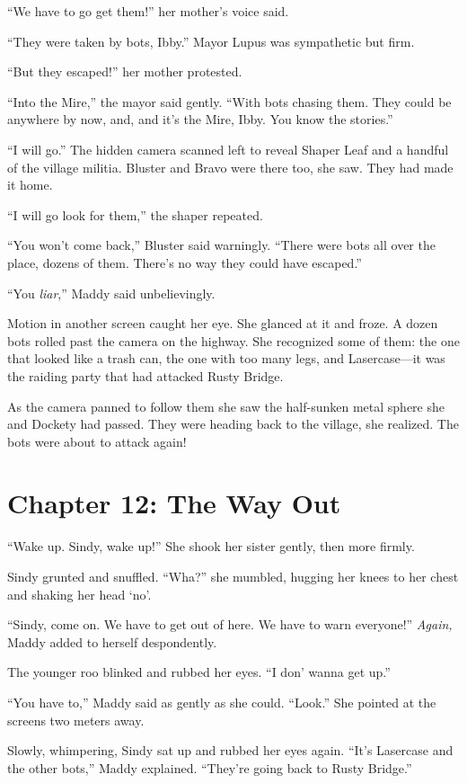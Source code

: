 \documentclass[10pt]{article}
\begin{document}
``We have to go get them!'' her mother's voice said.

``They were taken by bots, Ibby.'' Mayor Lupus was sympathetic but firm.

``But they escaped!'' her mother protested.

``Into the Mire,'' the mayor said gently. ``With bots chasing them. They
could be anywhere by now, and, and it's the Mire, Ibby. You know the
stories.''

``I will go.'' The hidden camera scanned left to reveal Shaper Leaf and
a handful of the village militia. Bluster and Bravo were there too, she
saw. They had made it home.

``I will go look for them,'' the shaper repeated.

``You won't come back,'' Bluster said warningly. ``There were bots all
over the place, dozens of them. There's no way they could have
escaped.''

``You \emph{liar},'' Maddy said unbelievingly.

Motion in another screen caught her eye. She glanced at it and froze. A
dozen bots rolled past the camera on the highway. She recognized some of
them: the one that looked like a trash can, the one with too many legs,
and Lasercase---it was the raiding party that had attacked Rusty Bridge.

As the camera panned to follow them she saw the half-sunken metal sphere
she and Dockety had passed. They were heading back to the village, she
realized. The bots were about to attack again!

\newpage
\section{Chapter 12: The Way Out}

``Wake up. Sindy, wake up!'' She shook her sister gently, then more
firmly.

Sindy grunted and snuffled. ``Wha?'' she mumbled, hugging her knees to
her chest and shaking her head `no'.

``Sindy, come on. We have to get out of here. We have to warn
everyone!'' \emph{Again,} Maddy added to herself despondently.

The younger roo blinked and rubbed her eyes. ``I don' wanna get up.''

``You have to,'' Maddy said as gently as she could. ``Look.'' She
pointed at the screens two meters away.

Slowly, whimpering, Sindy sat up and rubbed her eyes again. ``It's
Lasercase and the other bots,'' Maddy explained. ``They're going back to
Rusty Bridge.''
\end{document}
